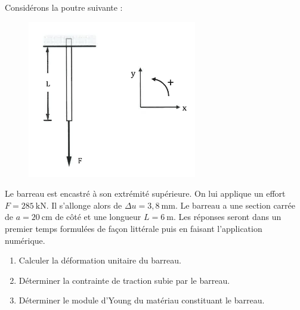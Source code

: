 \documentclass[lecture.tex]{subfiles}
\begin{document}
\exercice{}

Considérons la poutre suivante :

\begin{figure}[h!]
  \centering
  \includegraphics[scale=0.9]{fig1-rdm-0058.png}
\end{figure}

\medskip

Le barreau est encastré à son extrémité supérieure. On lui applique un effort $F = 285 \mathrm{~kN}$. Il s'allonge alors de $\Delta u = 3,8 \mathrm{~mm}$. Le barreau a une section carrée de $a=20 \mathrm{~cm}$ de côté et une longueur $L=6 \mathrm{~m}$. Les réponses seront dans un premier temps formulées de façon littérale puis en faisant l'application numérique.

\medskip

\begin{enumerate}
  \item Calculer la déformation unitaire du barreau.
  \item Déterminer la contrainte de traction subie par le barreau.
  \item Déterminer le module d'Young du matériau constituant le barreau.
\end{enumerate}

\finexercice
\end{document}
